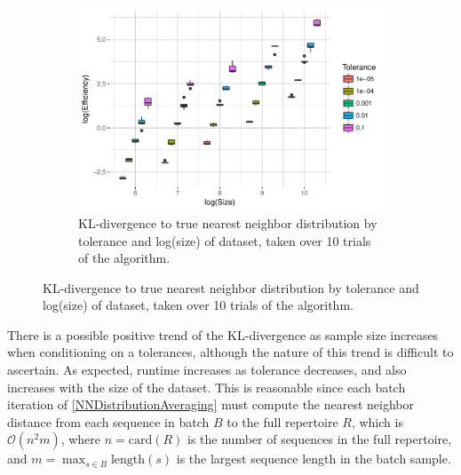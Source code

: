 \documentclass{article}
\begin{document}
\begin{figure}
\begin{subfigure}{0.5\textwidth}
    	\label{fig:NNTimeBySizeFull}
    \end{subfigure}
    \begin{subfigure}{0.5\textwidth}
        \includegraphics[width=\linewidth]{Figures/NearestNeighbor/efficiency_by_size_and_tol.pdf}
    	\caption{KL-divergence to true nearest neighbor distribution by tolerance and log(size) of dataset, taken over 10 trials of the algorithm.}
    	\label{fig:NNEfficiencyBySizeFull}
    \end{subfigure}
\end{figure}


There is a possible positive trend of the KL-divergence as sample size increases when conditioning on a tolerances, although the nature of this trend is difficult to ascertain.
As expected, runtime increases as tolerance decreases, and also increases with the size of the dataset.
This is reasonable since each batch iteration of \ref{NNDistributionAveraging} must compute the nearest neighbor distance from each sequence in batch $B$ to the full repertoire $R$, which is $\mathcal O(n^2 m)$, where $n = \text{card}(R)$ is the number of sequences in the full repertoire, and $m = \max_{s \in B} \text{length}(s)$ is the largest sequence length in the batch sample.
\end{document}

